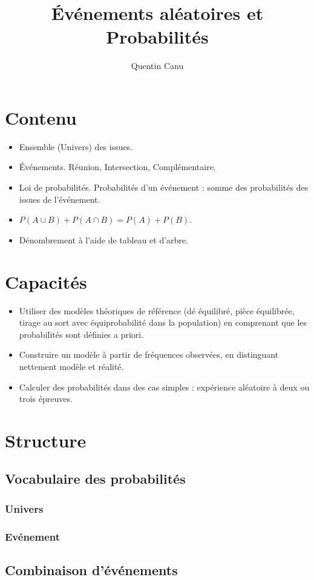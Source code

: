 \documentclass{article}
\title{\'Evénements aléatoires et Probabilités}
\date{}
\author{Quentin Canu}
\begin{document}
\maketitle
\section{Contenu}
\begin{itemize}
\item Ensemble (Univers) des issues.
\item \'Evénements. Réunion, Intersection, Complémentaire.
\item Loi de probabilités. Probabilités d'un événement : somme des probabilités des issues de l'événement.
\item $P(A \cup B) + P(A \cap B) = P(A) + P(B)$.
\item Dénombrement à l'aide de tableau et d'arbre.
\end{itemize}
\section{Capacités}
\begin{itemize}
\item Utiliser des modèles théoriques de référence (dé équilibré, pièce équilibrée, tirage au sort avec équiprobabilité dans la population) en comprenant que les probabilités sont définies a priori.
\item Construire un modèle à partir de fréquences observées, en distinguant nettement modèle et réalité.
\item Calculer des probabilités dans des cas simples : expérience aléatoire à deux ou trois épreuves. 
\end{itemize}
\section{Structure}
\subsection{Vocabulaire des probabilités}
\subsubsection{Univers}
\subsubsection{Evénement}
\subsection{Combinaison d'événements}
\end{document}
